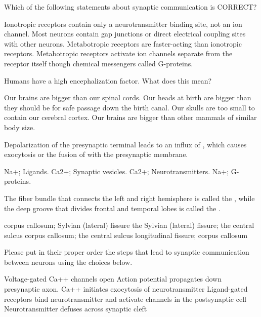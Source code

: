 \documentclass[]{exam}
\begin{document}
\begin{questions}
\question  Which of the following statements about synaptic communication is CORRECT?
\begin{choices}
\choice  Ionotropic receptors contain only a neurotransmitter binding site, not an ion channel.
\choice  Most neurons contain gap junctions or direct electrical coupling sites with other neurons. 
\choice  Metabotropic receptors are faster-acting than ionotropic receptors.
\choice  Metabotropic receptors activate ion channels separate from the receptor itself though chemical messengers called G-proteins.
\end{choices}

\newpage

\question  Humans have a high encephalization factor.  What does this mean?
\begin{choices}
\choice Our brains are bigger than our spinal cords.
\choice Our heads at birth are bigger than they should be for safe passage down the birth canal.
\choice Our skulls are too small to contain our cerebral cortex.
\choice Our brains are bigger than other mammals of similar body size.
\end{choices}

\question  Depolarization of the presynaptic terminal leads to an influx of \fillin, which causes exocytosis or the fusion of  \fillin with the presynaptic membrane.
\begin{choices}
\choice  Na+; Ligands. 
\choice  Ca2+; Synaptic vesicles.
\choice Ca2+; Neurotransmitters.
\choice  Na+; G-proteins.
\end{choices}

\question  The fiber bundle that connects the left and right hemisphere is called the \fillin, while the deep groove that divides frontal and temporal lobes is called the \fillin. 
\begin{choices}
\choice  corpus callosum; Sylvian (lateral) fissure
\choice  the Sylvian (lateral) fissure; the central sulcus
\choice  corpus callosum; the central sulcus
\choice  longitudinal fissure; corpus callosum
\end{choices}

\vspace{.25in}

Please put in their proper order the steps that lead to synaptic communication between neurons using the choices below.

\begin{choices}
\choice Voltage-gated Ca++ channels open
\choice Action potential propagates down presynaptic axon.
\choice Ca++ initiates exocytosis of neurotransmitter
\choice Ligand-gated receptors bind neurotransmitter and   activate channels in the postsynaptic cell
\choice Neurotransmitter defuses across synaptic cleft
\end{choices}


\end{questions}
\end{document}
